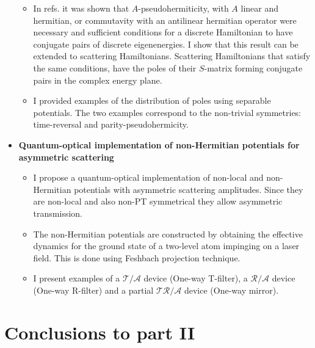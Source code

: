 \begin{itemize}
\begin{itemize}
    \item In refs. \cite{Mostafazadeh2002,Mostafazadeh2002a,Mostafazadeh2002b} it was shown that
    $A$-pseudohermiticity, with $A$ linear and hermitian, or commutavity with an antilinear hermitian operator were necessary and sufficient conditions for a discrete Hamiltonian to have conjugate pairs of discrete eigenenergies. I show that this result can be extended to scattering Hamiltonians. Scattering Hamiltonians that satisfy the same conditions, have the poles of their $S$-matrix forming conjugate pairs in the complex energy plane.

    \item I provided examples of the distribution of poles using separable potentials. The two examples correspond to the non-trivial symmetries: time-reversal and parity-pseudohermicity.

  \end{itemize}

  \item {\bf Quantum-optical implementation of non-Hermitian potentials for asymmetric scattering}
  \begin{itemize}
    \item I propose a quantum-optical implementation of non-local and non-Hermitian potentials
    with asymmetric scattering amplitudes. Since they are non-local and also non-PT symmetrical they allow asymmetric transmission.

    \item The non-Hermitian potentials are constructed by obtaining the effective dynamics for the ground state of a two-level atom impinging on a laser field. This is done using Feshbach projection technique.

    \item I present examples of a $\mathcal{T/A}$ device (One-way T-filter), a $\mathcal{R/A}$ device (One-way R-filter) and a partial $\mathcal{TR/A}$ device (One-way mirror).

  \end{itemize}

\end{itemize}

\section*{Conclusions to part II}

